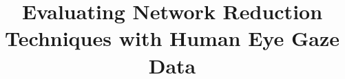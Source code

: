 \documentclass{llncs}
\begin{document}
\title{Evaluating Network Reduction Techniques with Human Eye Gaze Data}

\newcommand{\one}[1]{
}

\newcommand{\avg}[1]{
\addplot table [x=cycle, y expr=\thisrow{winavg}, col sep=comma] {#1};
}


\def \stdAO {
legend pos = south east, 
cycle list={cyan,magenta,teal,orange,violet,brown,black,pink,yellow,lime,red,green,blue,olive,purple,black!50!white},
width=40em, %
height=20em,
no marks
}

\def \stdAOM {
legend pos = outer north east, 
cycle list={cyan,magenta,teal,orange,violet,brown,black,pink,yellow,lime,red,green,blue,olive,purple,black!50!white},
width=34em, %
height=20em,
no marks
}

\newcommand{\cpt}[1]{
\caption{Average reward vs. time for #1}
}

\begin{figure}

\end{figure}
\end{document}
